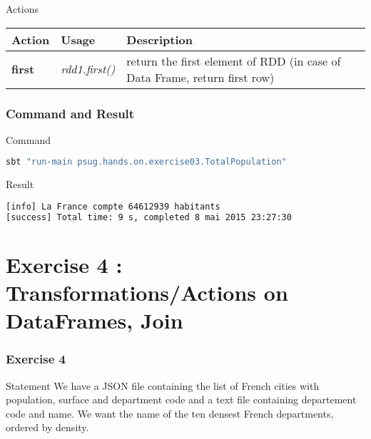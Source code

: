 \documentclass[slidetop,9pt,utf8]{beamer}
\begin{document}
\begin{CJK}{UTF8}{gbsn}
\begin{frame}
  \begin{block}{Actions}
    \begin{center}
      \begin{tabular}{|m{2.1cm}|m{3.5cm}|m{5cm}|}
        \hline 
        \rowcolor{gray} \textbf{Action} & \textbf{Usage} & \textbf{Description} \\ \hline
        \textbf{first} & \textit{rdd1.first()} & return the first element of RDD (in case of Data Frame, return first row) \\ \hline
      \end{tabular}
    \end{center}
  \end{block}

\end{frame}

\begin{frame}[fragile]
  \frametitle{Command and Result}

  \begin{block}{Command}
    \begin{lstlisting}[language=bash, style=terminal]
sbt "run-main psug.hands.on.exercise03.TotalPopulation"
    \end{lstlisting}
  \end{block}

  \begin{block}{Result}
    \begin{lstlisting}[language=bash, style=terminal]
[info] La France compte 64612939 habitants
[success] Total time: 9 s, completed 8 mai 2015 23:27:30
    \end{lstlisting}
  \end{block}

\end{frame}

\section{Exercise 4 : Transformations/Actions on DataFrames, Join}

\begin{frame}
  \frametitle{Exercise 4}

  \begin{block}{Statement}
    We have a JSON file containing the list of French cities with population, surface and department code and a text file containing departement code and name. We want the name of the ten densest French departments, ordered by density.
  \end{block}


\end{frame}
\end{CJK}
\end{document}
